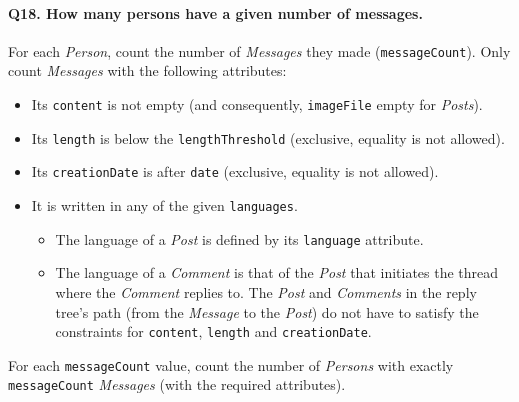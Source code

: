 \paragraph{\textbf{Q18}. How many persons have a given number of messages.}
For each \emph{Person}, count the number of \emph{Messages} they made
(\texttt{messageCount}). Only count \emph{Messages} with the following
attributes:
\begin{itemize}
\item
  Its \texttt{content} is not empty (and consequently,
  \texttt{imageFile} empty for \emph{Posts}).
\item
  Its \texttt{length} is below the \texttt{lengthThreshold} (exclusive,
  equality is not allowed).
\item
  Its \texttt{creationDate} is after \texttt{date} (exclusive, equality
  is not allowed).
\item
  It is written in any of the given \texttt{languages}.
  \begin{itemize}
  \tightlist
  \item
    The language of a \emph{Post} is defined by its \texttt{language}
    attribute.
  \item
    The language of a \emph{Comment} is that of the \emph{Post} that
    initiates the thread where the \emph{Comment} replies to. The
    \emph{Post} and \emph{Comments} in the reply tree's path (from the
    \emph{Message} to the \emph{Post}) do not have to satisfy the
    constraints for \texttt{content}, \texttt{length} and
    \texttt{creationDate}.
  \end{itemize}
\end{itemize}
For each \texttt{messageCount} value, count the number of \emph{Persons}
with exactly \texttt{messageCount} \emph{Messages} (with the required
attributes).
